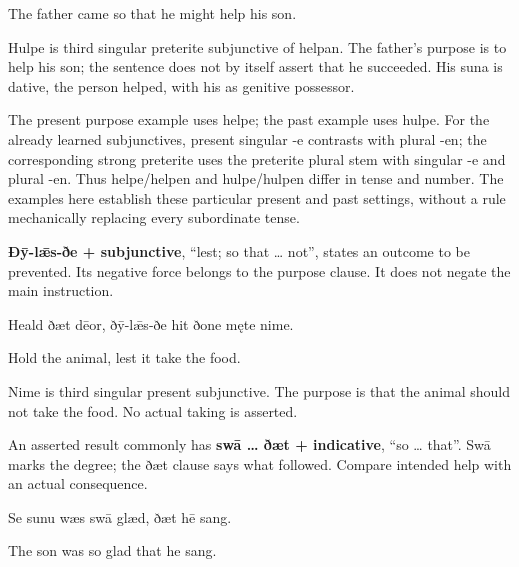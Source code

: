 The father came so that he might help his son.

Hulpe is third singular preterite subjunctive of helpan. The father’s purpose is to help his son; the sentence does not by itself assert that he succeeded. His suna is dative, the person helped, with his as genitive possessor.

The present purpose example uses helpe; the past example uses hulpe. For the already learned subjunctives, present singular -e contrasts with plural -en; the corresponding strong preterite uses the preterite plural stem with singular -e and plural -en. Thus helpe/\allowbreak{}helpen and hulpe/\allowbreak{}hulpen differ in tense and number. The examples here establish these particular present and past settings, without a rule mechanically replacing every subordinate tense.

\textbf{Ðȳ-lǣs-ðe + subjunctive}, “lest; so that … not”, states an outcome to be prevented. Its negative force belongs to the purpose clause. It does not negate the main instruction.

Heald ðæt dēor, ðȳ-lǣs-ðe hit ðone męte nime.

Hold the animal, lest it take the food.

Nime is third singular present subjunctive. The purpose is that the animal should not take the food. No actual taking is asserted.

An asserted result commonly has \textbf{swā … ðæt + indicative}, “so … that”. Swā marks the degree; the ðæt clause says what followed. Compare intended help with an actual consequence.

Se sunu wæs swā glæd, ðæt hē sang.

The son was so glad that he sang.


